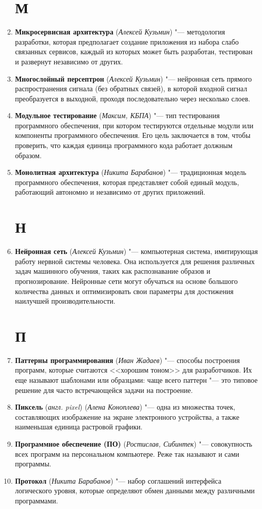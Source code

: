 \documentclass[14pt]{extarticle}
\begin{document}
\begin{enumerate}
    \section*{М}
    \item \textbf{Микросервисная архитектура} (\textit{Алексей Кузьмин}) "--- методология разработки, которая предполагает создание приложения из набора слабо связанных сервисов, каждый из которых может быть разработан, тестирован и развернут независимо от других.
    \item \textbf{Многослойный персептрон} (\textit{Алексей Кузьмин}) "--- нейронная сеть прямого распространения сигнала (без обратных связей), в которой входной сигнал преобразуется в выходной, проходя последовательно через несколько слоев.
    \item \textbf{Модульное тестирование} (\textit{Максим, КБПА}) "--- тип тестирования программного обеспечения, при котором тестируются отдельные модули или компоненты программного обеспечения. Его цель заключается в том, чтобы проверить, что каждая единица программного кода работает должным образом.
    \item \textbf{Монолитная архитектура} (\textit{Никита Барабанов}) "--- традиционная модель программного обеспечения, которая представляет собой единый модуль, работающий автономно и независимо от других приложений.
    \section*{Н}
    \item \textbf{Нейронная сеть} (\textit{Алексей Кузьмин}) "--- компьютерная система, имитирующая работу нервной системы человека. Она используется для решения различных задач машинного обучения, таких как распознавание образов и прогнозирование. Нейронные сети могут обучаться на основе большого количества данных и оптимизировать свои параметры для достижения наилучшей производительности.
    \section*{П}
    \item \textbf{Паттерны программирования} (\textit{Иван Жадаев}) "--- способы построения программ, которые считаются <<хорошим тоном>> для разработчиков. Их еще называют шаблонами или образцами: чаще всего паттерн "--- это типовое решение для часто встречающейся задачи на построение.
    \item \textbf{Пиксель} (\textit{англ. pixel}) (\textit{Алена Коноплева}) "--- одна из множества точек, составляющих изображение на экране электронного устройства, а также наименьшая единица растровой графики.
    \item \textbf{Программное обеспечение (ПО)} (\textit{Ростислав, Сибинтек}) "--- совокупность всех программ на персональном компьютере. Реже так называют и сами программы. 
    \item \textbf{Протокол} (\textit{Никита Барабанов}) "--- набор соглашений интерфейса логического уровня, которые определяют обмен данными между различными программами.

\end{enumerate}
\end{document}

